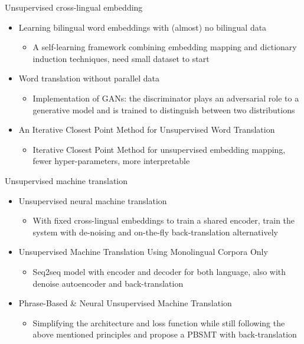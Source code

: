 \documentclass[11pt, a4paper, landscape]{article}
\begin{document}
	\vfill
	Unsupervised cross-lingual embedding
	\begin{itemize}
		\item 	\cite{artetxe2017learning} Learning bilingual word embeddings with (almost) no bilingual data
		\begin{itemize}
			\item A self-learning framework combining embedding mapping and dictionary induction techniques, need small dataset to start
		\end{itemize}	    
		\item 	\cite{conneau2017word} Word translation without parallel data
		\begin{itemize}
			\item Implementation of GANs: the discriminator plays an adversarial role to a generative model and is trained to distinguish between two distributions
		\end{itemize}	    
		\item \cite{hoshen2018iterative} An Iterative Closest Point Method for Unsupervised Word Translation
		\begin{itemize}
			\item Iterative Closest Point Method for unsupervised embedding mapping, fewer hyper-parameters, more interpretable
		\end{itemize}	    
	\end{itemize}
	
	
	
	
	
	
	\vfill
	
	\NewPage
	
	\vfill
	Unsupervised machine translation
	\begin{itemize}
		\item 	\cite{artetxe2017unsupervised} Unsupervised neural machine translation
		\begin{itemize}
			\item With fixed cross-lingual embeddings to train a shared encoder, train the system with de-noising and on-the-fly back-translation alternatively
		\end{itemize}
		\item \cite{lample2017unsupervised} Unsupervised Machine Translation Using Monolingual Corpora Only
		\begin{itemize} 
			\item Seq2seq model with encoder and decoder for both language, also with denoise autoencoder and back-translation
		\end{itemize}
		
		\item \cite{artetxe2017unsupervised} Phrase-Based \& Neural Unsupervised Machine Translation
		\begin{itemize}
			\item Simplifying the architecture and loss function while still following the above mentioned principles and propose a PBSMT with back-translation
		\end{itemize}	
		

	\end{itemize}
	
\end{document}
